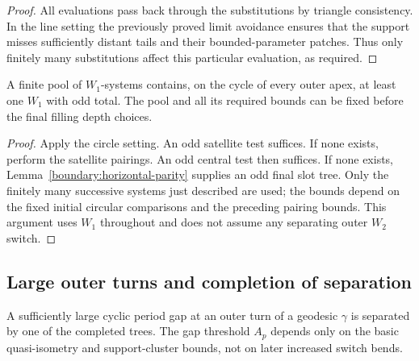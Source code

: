 \begin{proof}
All evaluations pass back through the substitutions by triangle
consistency. In the line setting the previously proved limit avoidance
ensures that the support misses sufficiently distant tails and their
bounded-parameter patches. Thus only finitely many substitutions affect
this particular evaluation, as required.
\end{proof}

\begin{corollary}\label{boundary:outer-odd-seeds}
A finite pool of $W_1$-systems contains, on the cycle of every outer apex,
at least one $W_1$ with odd total. The pool and all its required bounds can
be fixed before the final filling depth choices.
\end{corollary}

\begin{proof}
Apply the circle setting. An odd satellite test suffices. If none exists,
perform the satellite pairings. An odd central test then suffices. If none
exists, Lemma~\ref{boundary:horizontal-parity} supplies an odd final slot
tree. Only the finitely many successive systems just described are used;
the bounds depend on the fixed initial circular comparisons and the
preceding pairing bounds. This argument uses $W_1$ throughout and does not
assume any separating outer $W_2$ switch.
\end{proof}

\subsection{Large outer turns and completion of separation}

\begin{lemma}\label{boundary:large-outer}
A sufficiently large cyclic period gap at an outer turn of a geodesic
$\gamma$ is separated by one of the completed trees. The gap threshold
$A_p$ depends only on the basic quasi-isometry and support-cluster bounds,
not on later increased switch bends.
\end{lemma}

